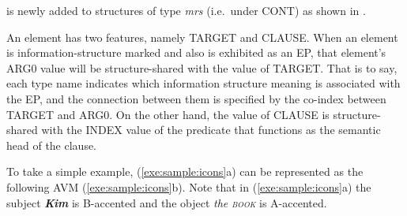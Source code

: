  is newly added to structures of type \textit{mrs} (i.e.\ under
CONT) as shown in .  



\noindent An  element has two features, namely TARGET and
CLAUSE. When an element is information-structure
marked and also is exhibited as an EP, that element's ARG0 value will
be structure-shared with the value of TARGET.  That is to say, each
type name indicates which information structure meaning is associated
with the EP, and the connection between them is specified by the
co-index between TARGET and ARG0.  On the other hand, the value of
CLAUSE is structure-shared with the INDEX value of the predicate that
functions as the semantic head of the clause.



To take a simple example, (\ref{exe:sample:icons}a) can be represented
as the following AVM (\ref{exe:sample:icons}b).  Note that in
(\ref{exe:sample:icons}a) the subject \textit{\textbf{Kim}} is
B-accented and the object \textit{the \textsc{book}} is
A-accented.

